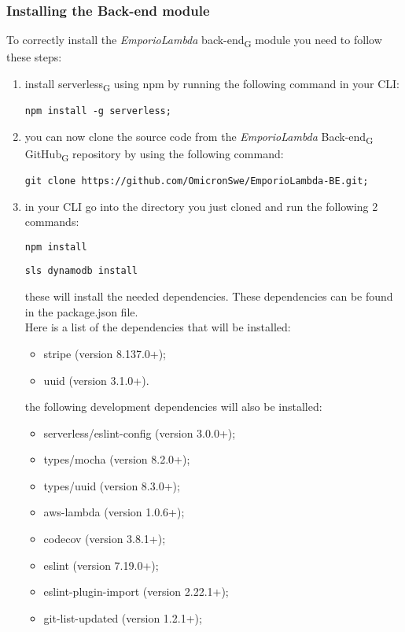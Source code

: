 \subsubsection{Installing the Back-end module}
To correctly install the \textit{EmporioLambda} back-end\textsubscript{G} module you need to follow these steps:
\begin{enumerate}
\item install serverless\textsubscript{G} using npm by running the following command in your CLI:\begin{center}
\texttt{npm install -g serverless;}
\end{center}
\item you can now clone the source code from the \textit{EmporioLambda} Back-end\textsubscript{G} GitHub\textsubscript{G} repository by using the following command:
\begin{center}
\texttt{git clone https://github.com/OmicronSwe/EmporioLambda-BE.git;}
\end{center}
\item in your CLI go into the directory you just cloned and run the following 2 commands:
\begin{center}
\texttt{npm install}
\end{center}
\begin{center}
\texttt{sls dynamodb install}
\end{center}
these will install the needed dependencies. These dependencies can be found in the package.json file.\\Here is a list of the dependencies that will be installed:
\begin{itemize}
\item stripe (version 8.137.0+);
\item uuid (version 3.1.0+).
\end{itemize}
the following development dependencies will also be installed:
\begin{itemize}
\item serverless/eslint-config (version 3.0.0+);
\item types/mocha (version 8.2.0+);
\item types/uuid (version 8.3.0+);
\item aws-lambda (version 1.0.6+);
\item codecov (version 3.8.1+);
\item eslint (version 7.19.0+);
\item eslint-plugin-import (version 2.22.1+);
\item git-list-updated (version 1.2.1+);

\end{itemize}
\end{enumerate}
